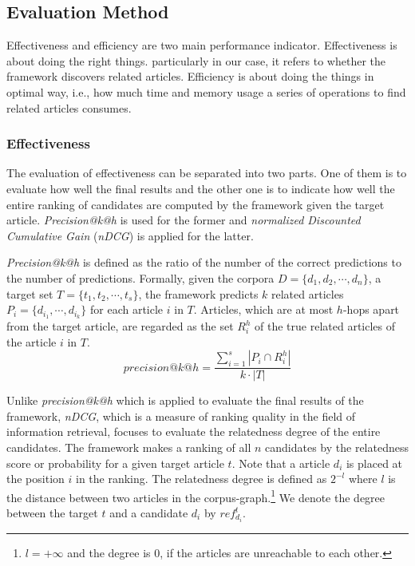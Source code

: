 \subsection{Evaluation Method}
\label{sec:3.3}

Effectiveness and efficiency are two main performance indicator. Effectiveness is about doing the right things. particularly in our case, it refers to whether the framework discovers related articles. Efficiency is about doing the things in optimal way, i.e., how much time and memory usage a series of operations to find related articles consumes. 

\subsubsection{Effectiveness}

The evaluation of effectiveness can be separated into two parts. One of them is to evaluate how well the final results and the other one is to indicate how well the entire ranking of candidates are computed by the framework given the target article. \textit{Precision@k@h} is used for the former and \textit{normalized Discounted Cumulative Gain} (\textit{nDCG}) is applied for the latter. 

\textit{Precision@k@h} is defined as the ratio of the number of the correct predictions to the number of predictions. Formally, given the corpora $D = \{d_1, d_2, \cdots, d_n\}$, a target set $T = \{t_1, t_2, \cdots, t_s\}$, the framework predicts $k$ related articles $P_i = \{d_{i_1}, \cdots, d_{i_k}\}$ for each article $i$ in $T$. Articles, which are at most $h$-hops apart from the target article, are regarded as the set $R_i^h$ of the true related articles of the article $i$ in $T$. 
\begin{equation}
    precision@k@h = \frac{\sum_{i=1}^s{|P_i \cap R_i^h|}}{k \cdot |T|}
\end{equation}

Unlike \textit{precision@k@h} which is applied to evaluate the final results of the framework, \textit{nDCG}, which is a measure of ranking quality in the field of information retrieval, focuses to evaluate the relatedness degree of the entire candidates. The framework makes a ranking of all $n$ candidates by the relatedness score or probability for a given target article $t$. Note that a article $d_i$ is placed at the position $i$ in the ranking. The relatedness degree is defined as $2^{-l}$ where $l$ is the distance between two articles in the corpus-graph.\footnote{$l=+\infty$ and the degree is $0$, if the articles are unreachable to each other.} We denote the degree between the target $t$ and a candidate $d_i$ by $ref_{d_i}^t$.

